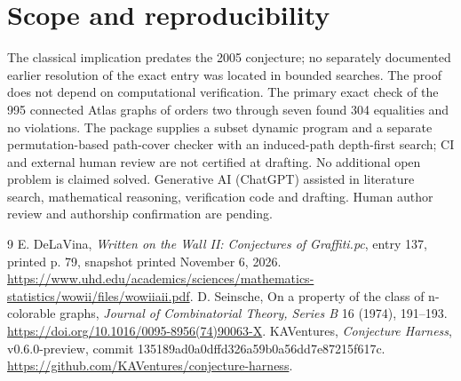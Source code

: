 \documentclass[11pt]{article}
\begin{document}
\section{Scope and reproducibility}
The classical implication predates the 2005 conjecture; no separately documented earlier resolution of the exact entry was located in bounded searches. The proof does not depend on computational verification. The primary exact check of the 995 connected Atlas graphs of orders two through seven found 304 equalities and no violations. The package supplies a subset dynamic program and a separate permutation-based path-cover checker with an induced-path depth-first search; CI and external human review are not certified at drafting. No additional open problem is claimed solved. Generative AI (ChatGPT) assisted in literature search, mathematical reasoning, verification code and drafting. Human author review and authorship confirmation are pending.
\begin{thebibliography}{9}
 E. DeLaVina, \emph{Written on the Wall II: Conjectures of Graffiti.pc}, entry 137, printed p. 79, snapshot printed November 6, 2026. \url{https://www.uhd.edu/academics/sciences/mathematics-statistics/wowii/files/wowiiaii.pdf}.
 D. Seinsche, On a property of the class of n-colorable graphs, \emph{Journal of Combinatorial Theory, Series B} 16 (1974), 191--193. \url{https://doi.org/10.1016/0095-8956(74)90063-X}.
 KAVentures, \emph{Conjecture Harness}, v0.6.0-preview, commit 135189ad0a0dffd326a59b0a56dd7e87215f617c. \url{https://github.com/KAVentures/conjecture-harness}.
\end{thebibliography}
\end{document}
